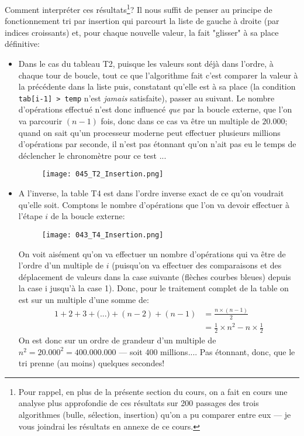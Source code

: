 \documentclass[12pt]{article}
\begin{document}
	Comment interpréter ces résultats\footnote{Pour rappel, en plus de la présente section du cours, on a fait en cours une analyse plus approfondie de ces résultats sur 200 passages des trois algorithmes (bulle, sélection, insertion) qu'on a pu comparer entre eux --- je vous joindrai les résultats en annexe de ce cours.}? Il nous suffit de penser au principe de fonctionnement tri par insertion qui parcourt la liste de gauche à droite (par indices croissants) et, pour chaque nouvelle valeur, la fait "glisser" à sa place définitive:
	\begin{itemize}
		\item Dans le cas du tableau T2, puisque les valeurs sont déjà dans l'ordre, à chaque tour de boucle, tout ce que l'algorithme fait c'est comparer la valeur à la précédente dans la liste puis, constatant qu'elle est à sa place (la condition \texttt{tab[i-1] > temp} n'est \textit{jamais} satisfaite), passer au suivant. Le nombre d'opérations effectué n'est donc influencé \textit{que} par la boucle externe, que l'on va parcourir $(n-1)$ fois, donc dans ce cas va être un multiple de $20.000$; quand on sait qu'un processeur moderne peut effectuer plusieurs millions d'opérations par seconde, il n'est pas étonnant qu'on n'ait pas eu le temps de déclencher le chronomètre pour ce test ...
		\begin{figure}[H]
			\centering
			\texttt{[image: 045\_T2\_Insertion.png]}
		\end{figure}
		\item A l'inverse, la table T4 est dans l'ordre inverse exact de ce qu'on voudrait qu'elle soit. Comptons le nombre d'opérations que l'on va devoir effectuer à l'étape $i$ de la boucle externe:
		\begin{figure}[H]
			\centering
			\texttt{[image: 043\_T4\_Insertion.png]}
		\end{figure}	
		On voit aisément qu'on va effectuer un nombre d'opérations qui va être de l'ordre d'un multiple de $i$ (puisqu'on va effectuer des comparaisons et des déplacement de valeurs dans la case suivante (flèches courbes bleues) depuis la case i jusqu'à la case 1). Donc, pour le traitement complet de la table on est sur un multiple d'une somme de:
		\begin{align*}
			1 + 2 + 3 + \text{(...)} + (n-2) + (n-1) &= \frac{n\times (n-1)}{2} \\
			&= \frac{1}{2} \times n^2 - n \times \frac{1}{2}
		\end{align*}
		On est donc sur un ordre de grandeur d'un multiple de $n^2 = 20.000^2 = 400.000.000$  --- soit 400 millions.... Pas étonnant, donc, que le tri prenne (au moins) quelques secondes!
	\end{itemize}
	
\end{document}
